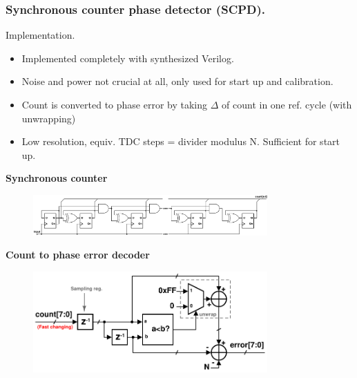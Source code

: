 \documentclass[t, screen, aspectratio=43]{beamer}
\begin{document}
\begin{frame}
	\frametitle{Synchronous counter phase detector (SCPD).}
	\begin{block}{Implementation.}
		\begin{minipage}{4cm}
			\vspace{1em}
			\tiny
			\begin{itemize}[itemsep=4pt,label=\protect---]
			        \item Implemented completely with synthesized Verilog.
			        \item Noise and power not crucial at all, only used for start up and calibration.
			        \item Count is converted to phase error by taking $\Delta$ of count in one ref. cycle (with unwrapping)
			        \item Low resolution, equiv. TDC steps = divider modulus N. Sufficient for start up. 
			\end{itemize}
		\end{minipage}%
		\begin{minipage}{8cm}
			\tiny \textbf{\hspace{3em}Synchronous counter}
			\begin{figure}[htb!]
			        \centering
			        \includegraphics[width=0.8\textwidth, angle=0]{sync_counter}
			\end{figure}
			\tiny \textbf{\hspace{3em}Count to phase error decoder}
			\vspace{-1em}
			\begin{figure}[htb!]
			        \centering
			        \includegraphics[width=0.8\textwidth, angle=0]{sc_decoder}
			\end{figure}

		\end{minipage}%

	\end{block}	
\end{frame}
\end{document}
